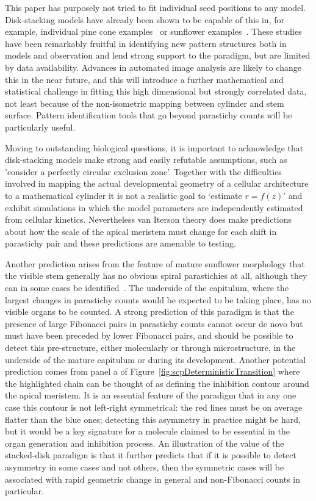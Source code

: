 \documentclass[a4paper,10pt]{amsart}
\begin{document}
This paper has purposely not tried to fit individual seed positions to any model.  Disk-stacking models have already been shown to be capable of this in, for example, individual pine cone examples~\cite{douadyFibonacciQuasisymmetricPhyllotaxis2016} or sunflower examples~\cite{hottonPossibleActualPhyllotaxis2006}. These studies have been remarkably fruitful in identifying new pattern structures both in models and observation and lend strong support to the paradigm, but are limited by data availability.  Advances in automated image analysis are likely to change this in the near future, and this will introduce a further mathematical and statistical challenge in fitting this high dimensional but strongly correlated data, not least because of the non-isometric mapping between cylinder and stem surface. Pattern identification tools that go beyond parastichy counts will be particularly useful.


Moving to outstanding biological questions, it is important 
to acknowledge that disk-stacking models make strong and easily refutable assumptions, such as 'consider a perfectly circular exclusion zone'. Together with the difficulties involved in mapping the actual developmental geometry of a cellular architecture to a mathematical cylinder it is not a realistic goal to `estimate $r=f(z)$' and exhibit simulations in which the model parameters are independently estimated from cellular kinetics. Nevertheless van Iterson theory does make predictions about how the scale of the apical meristem must change for each shift in parastichy pair and these predictions are amenable to testing. 

Another prediction arises from the  feature of mature sunflower morphology that the visible stem generally has no obvious spiral parastichies at all, although they can in some cases be identified~\cite{couderInitialTransitionsOrder1998}. The underside of the capitulum, where the largest changes in parastichy counts would be expected to be taking place, has no visible organs to be counted. A strong prediction of this paradigm is that the presence of large Fibonacci pairs in parastichy counts cannot occur de novo but must have been preceded by lower Fibonacci pairs, and should be possible to detect this pre-structure, either molecularly or through microstructure, in the underside of the mature capitulum or during its development. Another
potential prediction comes from panel a of Figure~\ref{fig:scpDeterministicTransition} where the highlighted chain can be thought of as defining the inhibition contour around the apical meristem. It is an essential feature of the paradigm that in any one case this contour is not left-right symmetrical: the red lines must be on average flatter than the blue ones; detecting this asymmetry in practice might be  hard, but it would be  a key signature for a molecule claimed to be essential in the organ generation and inhibition process. An illustration of the value of the stacked-disk paradigm is that it further predicts that if it is possible to detect asymmetry in some cases and not others, then the symmetric cases will be associated with rapid geometric change in general and non-Fibonacci counts in particular. 
\end{document}
